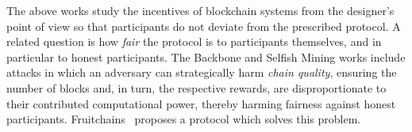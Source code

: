 The above works study the incentives of blockchain systems from the designer's
point of view so that participants do not deviate from the prescribed protocol.
A related question is how \emph{fair} the protocol is to participants
themselves, and in particular to honest participants. The Backbone and Selfish
Mining works include attacks in which an adversary can strategically harm
\emph{chain quality}, ensuring the number of blocks and, in turn, the respective
rewards, are disproportionate to their contributed computational power, thereby
harming fairness against honest participants. Fruitchains~\cite{fruitchains}
proposes a protocol which solves this problem.

